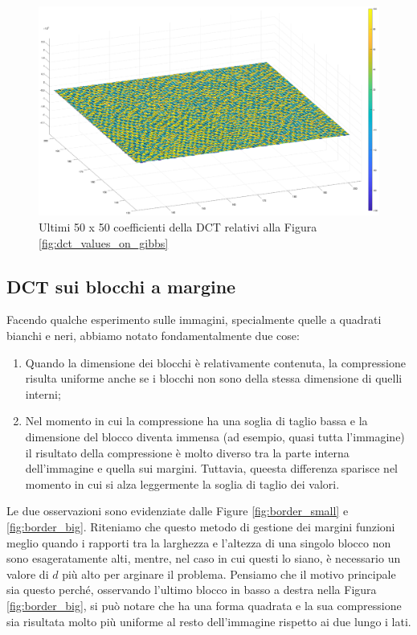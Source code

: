 \begin{figure}
	\centering
	\includegraphics[width=1\linewidth]{figures/last_dct_values.eps}

	\caption{Ultimi 50 x 50 coefficienti della DCT relativi alla Figura \ref{fig:dct_values_on_gibbs}}
	\label{fig:last_dct_values_gibbs}
\end{figure}
\FloatBarrier

\subsection{DCT sui blocchi a margine}
Facendo qualche esperimento sulle immagini, specialmente quelle a quadrati bianchi e neri, abbiamo notato fondamentalmente due cose:
\begin{enumerate}
	\item Quando la dimensione dei blocchi è relativamente contenuta, la compressione risulta uniforme anche se i blocchi non sono della stessa dimensione di quelli interni;
	\item Nel momento in cui la compressione ha una soglia di taglio bassa e la dimensione del blocco diventa immensa (ad esempio, quasi tutta l'immagine) il risultato della compressione è molto diverso tra la parte interna dell'immagine e quella sui margini. Tuttavia, queesta differenza sparisce nel momento in cui si alza leggermente la soglia di taglio dei valori.
\end{enumerate}
Le due osservazioni sono evidenziate dalle Figure \ref{fig:border_small} e \ref{fig:border_big}. Riteniamo che questo metodo di gestione dei margini funzioni meglio quando i rapporti tra la larghezza e l'altezza di una singolo blocco non sono esageratamente alti,  mentre, nel caso in cui questi lo siano, è necessario un valore di $d$ più alto per arginare il problema. Pensiamo che il motivo principale sia questo perché, osservando l'ultimo blocco in basso a destra nella Figura \ref{fig:border_big}, si può notare che ha una forma quadrata e la sua compressione sia risultata molto più uniforme al resto dell'immagine rispetto ai due lungo i lati.


